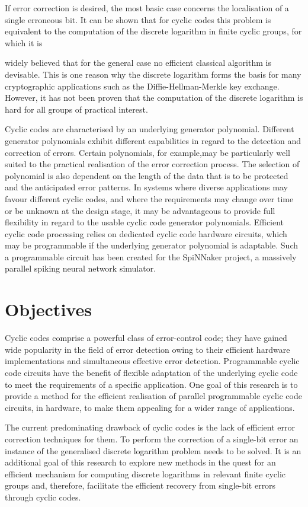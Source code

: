\documentclass[oneside, a4paper, 11pt]{memoir}
\begin{document}
If error correction is desired, the most basic case concerns the localisation of a single erroneous bit. It can be shown that for cyclic codes this problem is equivalent to the computation of the discrete logarithm in finite cyclic groups, for which it is

widely believed that for the general case no efficient classical algorithm is devisable. This is one reason why the discrete logarithm forms the basis for many cryptographic applications such as the Diffie-Hellman-Merkle key exchange. However, it has not been proven that the computation of the discrete logarithm is hard for all groups of practical interest.

Cyclic codes are characterised by an underlying generator polynomial. Different generator polynomials exhibit different capabilities in regard to the detection and correction of errors. Certain polynomials, for example,may be particularly well suited to the practical realisation of the error correction process. The selection of polynomial is also dependent on the length of the data that is to be protected and the anticipated error patterns. In systems where diverse applications may favour different cyclic codes, and where the requirements may change over time or be unknown at the design stage, it may be advantageous to provide full flexibility in regard to the usable cyclic code generator polynomials. Efficient cyclic code processing relies on dedicated cyclic code hardware circuits, which may be programmable if the underlying generator polynomial is adaptable. Such a programmable circuit has been created for the SpiNNaker project, a massively parallel spiking neural network simulator.

\section{Objectives}
Cyclic codes comprise a powerful class of error-control code; they have gained wide popularity in the field of error detection owing to their efficient hardware implementations and simultaneous effective error detection. Programmable cyclic code circuits have the benefit of flexible adaptation of the underlying cyclic code to meet the requirements of a specific application. One goal of this research is to provide a method for the efficient realisation of parallel programmable cyclic code circuits, in hardware, to make them appealing for a wider range of applications.

The current predominating drawback of cyclic codes is the lack of efficient error correction techniques for them. To perform the correction of a single-bit error an instance of the generalised discrete logarithm problem needs to be solved. It is an additional goal of this research to explore new methods in the quest for an efficient mechanism for computing discrete logarithms in relevant finite cyclic groups and, therefore, facilitate the efficient recovery from single-bit errors through cyclic codes.
\end{document}
